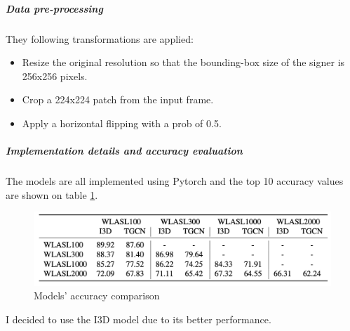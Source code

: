 \subparagraph{Data pre-processing} They following transformations are applied:
\begin{itemize}[noitemsep]
    \item Resize the original resolution so that the bounding-box size of the signer is 256x256 pixels.
    \item Crop a 224x224 patch from the input frame.
    \item Apply a horizontal flipping with a prob of 0.5.
\end{itemize}

\subparagraph{Implementation details and accuracy evaluation} The models are all implemented using Pytorch and the top 10 accuracy values are shown on table \ref{fig:introduction_model_accuracy_comparison}. \\
\begin{figure}[H]
    \centering
        \includegraphics[width=1.0\textwidth]{assets/models_accuracy.png}
    \caption{Models' accuracy comparison}
    \label{fig:introduction_model_accuracy_comparison}
\end{figure}

I decided to use the I3D model due to its better performance.
